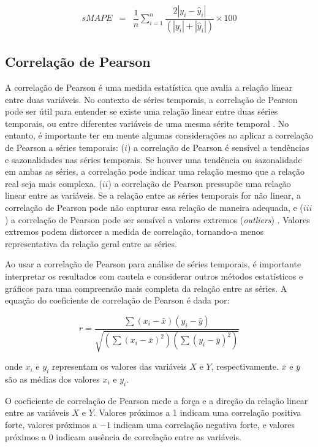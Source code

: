  \begin{eqnarray}
 	sMAPE &=& \dfrac{1}{n} \sum_{i=1}^{n} \dfrac{2|y_i - \hat{y}_i|}{(|y_i| + |\hat{y}_i|)} \times 100\label{eq:smape}
 \end{eqnarray}
 

\subsection{Correla\c c\~ao de Pearson}

A correlação de Pearson é uma medida estatística que avalia a relação linear entre duas variáveis. No contexto de séries temporais, a correlação de Pearson pode ser útil para entender se existe uma relação linear entre duas séries temporais, ou entre diferentes variáveis de uma mesma sérite temporal \cite{CESARDELIMANOGUEIRA2023128066}. No entanto, é importante ter em mente algumas considerações ao aplicar a correlação de Pearson a séries temporais: ($i$) a correlação de Pearson é sensível a tendências e sazonalidades nas séries temporais. Se houver uma tendência ou sazonalidade em ambas as séries, a correlação pode indicar uma relação mesmo que a relação real seja mais complexa. ($ii$) a correlação de Pearson pressupõe uma relação linear entre as variáveis. Se a relação entre as séries temporais for não linear, a correlação de Pearson pode não capturar essa relação de maneira adequada, e ($iii$) a correlação de Pearson pode ser sensível a valores extremos (\textit{outliers}) \cite{DOSSANTOSCOELHO2024129366}. Valores extremos podem distorcer a medida de correlação, tornando-a menos representativa da relação geral entre as séries.

Ao usar a correlação de Pearson para análise de séries temporais, é importante interpretar os resultados com cautela e considerar outros métodos estatísticos e gráficos para uma compreensão mais completa da relação entre as séries. A equação do coeficiente de correlação de Pearson é dada por:
 
 \begin{equation}
 	r=\frac{\sum\left(x_i-\bar{x}\right)\left(y_i-\bar{y}\right)}{\sqrt{\left(\sum\left(x_i-\bar{x}\right)^2\right)\left(\sum\left(y_i-\bar{y}\right)^2\right)}}
 \end{equation}
 
 \noindent onde $x_i$ e $y_i$ representam os valores das variáveis $X$ e $Y$, respectivamente. $\bar{x}$ e $\bar{y}$ são as médias dos valores $x_i$ e $y_i$. 
 
O coeficiente de correlação de Pearson mede a força e a direção da relação linear entre as variáveis $X$ e $Y$. Valores próximos a 1 indicam uma correlação positiva forte, valores próximos a $-1$ indicam uma correlação negativa forte, e valores próximos a $0$ indicam  ausência de correlação entre as variáveis.
 
